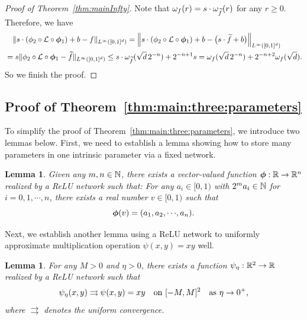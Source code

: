 \documentclass[nohyperref]{article}
\theoremstyle{plain}
\newtheorem{lemma}[theorem]{Lemma}
\theoremstyle{definition}
\theoremstyle{remark}
\begin{document}
\begin{proof}[Proof of Theorem~\ref{thm:mainInfty}]
	Note that $\omega_f(r)=s \cdot \omega_{\widetilde{f}}(r)$ for any $r\ge 0$. Therefore, we have
	\begin{equation*}
		\begin{split}
			&\quad \|s\cdot(\phi_2\circ {\mathcal{L}} \circ {\bm{\phi}}_1)+b -f\|_{L^\infty([0,1]^d)}
			=\Big\|s\cdot (\phi_2\circ {\mathcal{L}} \circ {\bm{\phi}}_1)+ b-\big(s\cdot {\widetilde{f}}+b\big)\Big\|_{L^\infty([0,1]^d)}\\
			&=s\|\phi_2\circ{\mathcal{L}}\circ{\bm{\phi}}_1-{\widetilde{f}}\|_{L^\infty([0,1]^d)}\le s\cdot \omega_{\widetilde{f}}(\sqrt{d}\, 2^{-n})+ 2^{-n+1}  s
			= \omega_f(\sqrt{d}\,2^{-n})+2^{-n+2}\omega_f(\sqrt{d}).
		\end{split}
	\end{equation*}
	So we finish the proof.
\end{proof}


\subsection{Proof of Theorem~\ref{thm:main:three:parameters}}

To simplify the proof of  Theorem~\ref{thm:main:three:parameters}, we introduce two lemmas below.
First, we need to establish a lemma showing how to store many parameters in one intrinsic parameter via a fixed network.
\begin{lemma}\label{lem:store:parameter}
	Given any $m,n\in\N$, there exists a vector-valued function $\bmphi:\R\to\R^n$ realized by a ReLU network  such that: For any $a_i\in [0,1)$ with $2^m a_i\in \N$ for $i=0,1,\cdots,n$, there exists a real number $v\in [0,1)$ such that
	\begin{equation*}
		\bmphi(v)=(a_1,a_2,\cdots,a_n).
	\end{equation*}
\end{lemma}
Next, we establish another lemma using a ReLU network to uniformly approximate multiplication operation $\psi(x,y)=xy$ well. 
\begin{lemma}\label{lem:xy}
	For any $M>0$ and $\eta>0$, there exists a function $\psi_{\eta}:\R^2\to\R$ realized by a ReLU network  such that
	\begin{equation*}
		\psi_{\eta}(x,y)\rightrightarrows \psi(x,y)=xy\quad \textnormal{on $[-M,M]^2$\quad as $\eta\to 0^+$},
	\end{equation*}
	where $\rightrightarrows$ denotes the uniform convergence.
\end{lemma}
\end{document}
